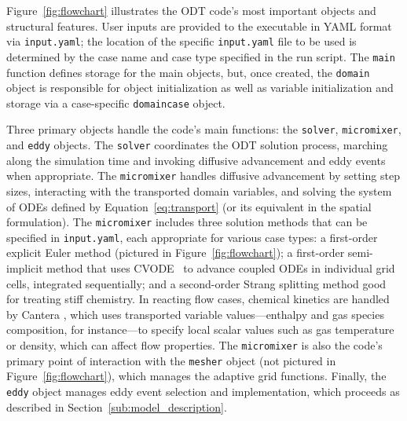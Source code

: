 \documentclass[preprint,12pt, a4paper]{elsarticle}
\begin{document}
Figure~\ref{fig:flowchart} illustrates the ODT code's most important objects and structural features. User inputs are provided to the executable in YAML \cite{Beder_2008} format via \texttt{input.yaml}; the location of the specific \texttt{input.yaml} file to be used is determined by the case name and case type specified in the run script. The \texttt{main} function defines storage for the main objects, but, once created, the \texttt{domain} object is responsible for object initialization as well as variable initialization and storage via a case-specific \texttt{domaincase} object. 

Three primary objects handle the code's main functions: the \texttt{solver}, \texttt{micromixer}, and \texttt{eddy} objects. The \texttt{solver} coordinates the ODT solution process, marching along the simulation time and invoking diffusive advancement and eddy events when appropriate. The \texttt{micromixer} handles diffusive advancement by setting step sizes, interacting with the transported domain variables, and solving the system of ODEs defined by Equation~\ref{eq:transport} (or its equivalent in the spatial formulation). The \texttt{micromixer} includes three solution methods that can be specified in \texttt{input.yaml}, each appropriate for various case types: a first-order explicit Euler method (pictured in Figure~\ref{fig:flowchart}); a first-order semi-implicit method that uses CVODE~\cite{Hindmarsh_2020} to advance coupled ODEs in individual grid cells, integrated sequentially; and a second-order Strang splitting method \cite{Strang_1968} good for treating stiff chemistry. In reacting flow cases, chemical kinetics are handled by Cantera \cite{Goodwin_2018}, which uses transported variable values---enthalpy and gas species composition, for instance---to specify local scalar values such as gas temperature or density, which can affect flow properties. The \texttt{micromixer} is also the code's primary point of interaction with the \texttt{mesher} object (not pictured in Figure~\ref{fig:flowchart}), which manages the adaptive grid functions. Finally, the \texttt{eddy} object manages eddy event selection and implementation, which proceeds as described in Section~\ref{sub:model_description}.  

\end{document}
